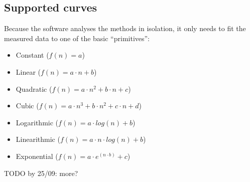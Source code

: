 \subsection{Supported curves}
Because the software analyses the methods in isolation, it only needs to fit the measured data to one of the basic \enquote{primitives}:
\begin{itemize}
  \item Constant ($f(n) = a$)
  \item Linear ($f(n) = a \cdot n + b$)
  \item Quadratic ($f(n) = a \cdot n^2 + b \cdot n + c$)
  \item Cubic ($f(n) = a \cdot n^3 + b \cdot n^2 + c \cdot n + d$)
  \item Logarithmic ($f(n) = a \cdot log(n) + b$)
  \item Linearithmic ($f(n) = a \cdot n \cdot log(n) + b$)
  \item Exponential ($f(n) = a \cdot e^{(n \cdot b)} + c$)
\end{itemize}


\noindent TODO by 25/09: more?